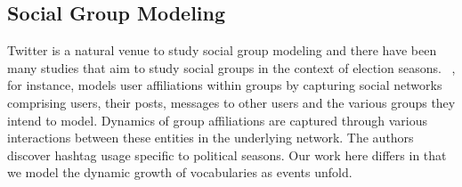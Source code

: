 \begin{comment}
\subsection{Flawed Studies?}
Recent coverage of election forecasting using Twitter has been critical, e.g.,
see~\cite{metaxas2011not,gayo2012wanted}
These publications not only list pertinent problems
in using Twitter to forecast elections but also detail recommendations on how to make such methodologies better.
Gayo-Avello surveys %
the state-of-the-art approaches in predicting elections, 
most of which have been detailed above.
Gayo-Avello argues that post-hoc analysis of elections in retrospect must not count as valid predictions and that researchers 
must be wary of the \emph{file drawer} effect, i.e., the act of filing away negative results and publishing 
only the positive results. His major points of contention against such models are:
lack of explainability, no direct way to model a `vote' in social media, self-selection bias,
unrepresentativeness of Twitter demographics, lack of sophisticated sentiment modeling strategies
(e.g., to detect humor and sarcasm that abound in political conversations), and inability to capture
indifferences among the voting public (i.e., 
abstaining from tweeting about politics can carry as much signal as explicit mentions
of candidates). Finally, it has been shown that many of these models %
do not outperform a simple
base model that forecasts success for the incumbent.
Our approach here is to aid in better modeling of social groups and improve such predictions.
A truly comprehensive system will utilize social media as just one of its strategies in forecasting and
we do not make any claims of developing a universal forecasting system for elections.
\end{comment}

\subsection{Social Group Modeling}
Twitter is a natural venue to study social group modeling and there have been many studies that aim to
study social groups in the context of election seasons.
~\cite{huang2012social}, for instance,
models user affiliations within groups by capturing social networks comprising users, their posts,
messages to other users and the various groups they intend to model.
Dynamics of group affiliations are captured through various interactions between these entities in the underlying
network. The authors discover hashtag usage specific to political seasons.
Our work here differs in that we model the dynamic growth of vocabularies as events unfold.

